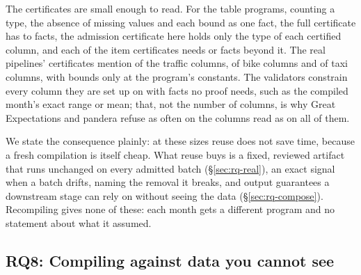 The certificates are small enough to read. For the \CsPrograms{} table programs, counting a type, the
absence of missing values and each bound as one fact, the full certificate has \CsFullMin{} to
\CsFullMax{} facts, the admission certificate here holds only the type of each certified column, and
each of the \CsItems{} item certificates needs \CsItemMin{} or \CsItemMax{} facts beyond it. The real
pipelines' certificates mention \CsTrafficCols{} of the \CsTrafficFileCols{} traffic columns,
\CsBikesCols{} of \CsBikesFileCols{} bike columns and \CsTaxiCols{} of \CsTaxiFileCols{} taxi columns,
with bounds only at the program's constants. The validators constrain every column they are set up on
with facts no proof needs, such as the compiled month's exact range or mean; that, not the number of
columns, is why Great Expectations and pandera refuse as often on the columns read as on all of them.

We state the consequence plainly: at these sizes reuse does not save time, because a fresh compilation is
itself cheap. What reuse buys is a fixed, reviewed artifact that runs unchanged on every admitted batch
(\S\ref{sec:rq-real}), an exact signal when a batch drifts, naming the removal it breaks, and output
guarantees a downstream stage can rely on without seeing the data (\S\ref{sec:rq-compose}). Recompiling
gives none of these: each month gets a different program and no statement about what it assumed.

\subsection{RQ8: Compiling against data you cannot see}\label{sec:rq-private}

